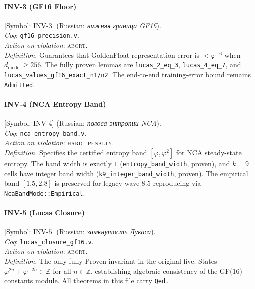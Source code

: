 \paragraph*{\textmd{\textbf{INV-3 (GF16 Floor)}}}
\label{entry:inv3}
[Symbol: $\mathrm{INV}\text{-}3$] (Russian: \textit{нижняя граница GF16}).\\
\textit{Coq}: \texttt{gf16\_precision.v}.\\
\textit{Action on violation}: \textsc{abort}.\\
\textit{Definition.}
Guarantees that GoldenFloat representation error is $< \varphi^{-6}$
when $d_{\mathrm{model}} \ge 256$.
The fully proven lemmas are \texttt{lucas\_2\_eq\_3}, \texttt{lucas\_4\_eq\_7},
and \texttt{lucas\_values\_gf16\_exact\_n1/n2}.
The end-to-end training-error bound remains \texttt{Admitted}.

\paragraph*{\textmd{\textbf{INV-4 (NCA Entropy Band)}}}
\label{entry:inv4}
[Symbol: $\mathrm{INV}\text{-}4$] (Russian: \textit{полоса энтропии NCA}).\\
\textit{Coq}: \texttt{nca\_entropy\_band.v}.\\
\textit{Action on violation}: \textsc{hard\_penalty}.\\
\textit{Definition.}
Specifies the certified entropy band $[\varphi, \varphi^2]$ for NCA
steady-state entropy.
The band width is exactly $1$ (\texttt{entropy\_band\_width}, proven),
and $k=9$ cells have integer band width (\texttt{k9\_integer\_band\_width},
proven).
The empirical band $[1.5, 2.8]$ is preserved for legacy wave-8.5
reproducing via \texttt{NcaBandMode::Empirical}.

\paragraph*{\textmd{\textbf{INV-5 (Lucas Closure)}}}
\label{entry:inv5}
[Symbol: $\mathrm{INV}\text{-}5$] (Russian: \textit{замкнутость Лукаса}).\\
\textit{Coq}: \texttt{lucas\_closure\_gf16.v}.\\
\textit{Action on violation}: \textsc{abort}.\\
\textit{Definition.}
The only fully Proven invariant in the original five.
States $\varphi^{2n}+\varphi^{-2n} \in \mathbb{Z}$ for all $n\in\mathbb{Z}$,
establishing algebraic consistency of the GF(16) constants module.
All theorems in this file carry \texttt{Qed.}

